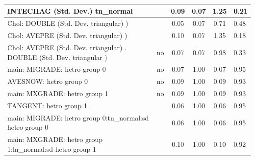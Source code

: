 \begin{table}
\begin{center}
\begin{tabular}{|l|l|c|c|c|l|}
			INTECHAG (Std. Dev.) tn_normal &  & 0.09 & 0.07 & 1.25 & 0.21 \\
			\hline
			 Chol: DOUBLE (Std. Dev. triangular) ) &  & 0.05 & 0.07 & 0.71 & 0.48 \\
			\hline
			 Chol: AVEPRE (Std. Dev. triangular) ) &  & 0.10 & 0.07 & 1.35 & 0.18 \\
			\hline
			 Chol: AVEPRE (Std. Dev. triangular) . DOUBLE (Std. Dev.   triangular ) & no & 0.07 & 0.07 & 0.98 & 0.33 \\
			\hline
			main: MIGRADE: hetro group 0 & no & 0.07 & 1.00 & 0.07 & 0.95 \\
			\hline
			AVESNOW: hetro group 0 & no & 0.09 & 1.00 & 0.09 & 0.93 \\
			\hline
			main: MXGRADE: hetro group 1 & no & 0.09 & 1.00 & 0.09 & 0.93 \\
			\hline
			TANGENT: hetro group 1 &  & 0.06 & 1.00 & 0.06 & 0.95 \\
			\hline
			main: MIGRADE: hetro group 0:tn_normal:sd  hetro group 0 &  & 0.06 & 1.00 & 0.06 & 0.95 \\
			\hline
			main: MXGRADE: hetro group 1:ln_normal:sd  hetro group 1 &  & 0.10 & 1.00 & 0.10 & 0.92 \\
			\hline
		\end{tabular}
	\end{center}
\end{table}